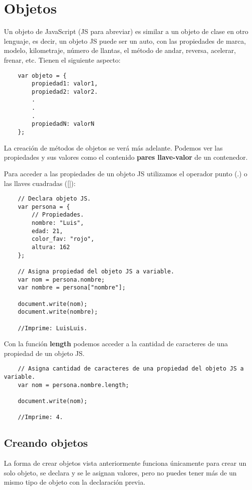 \section{Objetos}

Un objeto de JavaScript (JS para abreviar) es similar a un objeto de clase en otro lenguaje, es decir, un objeto JS puede ser un auto, con las propiedades de marca, modelo, kilometraje, número de llantas, el método de andar, reversa, acelerar, frenar, etc. Tienen el siguiente aspecto:
\begin{lstlisting}
    var objeto = {
        propiedad1: valor1,
        propiedad2: valor2.
        .
        .
        .
        propiedadN: valorN
    };
\end{lstlisting}

La creación de métodos de objetos se verá más adelante. Podemos ver las propiedades y sus valores como el contenido \textbf{pares llave-valor} de un contenedor.

Para acceder a las propiedades de un objeto JS utilizamos el operador punto (.) o las llaves cuadradas ([]):
\begin{lstlisting}
    // Declara objeto JS.
    var persona = {
        // Propiedades.
        nombre: "Luis",
        edad: 21,
        color_fav: "rojo",
        altura: 162
    };

    // Asigna propiedad del objeto JS a variable.
    var nom = persona.nombre;
    var nombre = persona["nombre"];

    document.write(nom);
    document.write(nombre);

    //Imprime: LuisLuis.
\end{lstlisting}

Con la función \textbf{length} podemos acceder a la cantidad de caracteres de una propiedad de un objeto JS.
\begin{lstlisting}
    // Asigna cantidad de caracteres de una propiedad del objeto JS a variable.
    var nom = persona.nombre.length;

    document.write(nom);

    //Imprime: 4.
\end{lstlisting}


\subsection{Creando objetos}

La forma de crear objetos vista anteriormente funciona únicamente para crear un solo objeto, se declara y se le asignan valores, pero no puedes tener más de un mismo tipo de objeto con la declaración previa.

